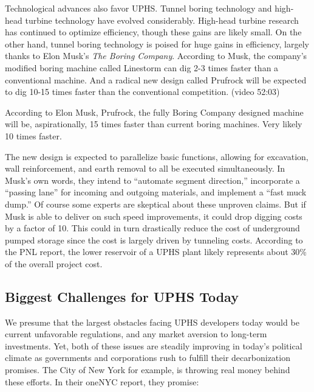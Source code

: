 \documentclass[hidelinks,12pt,a4paper]{article}
\begin{document}
Technological advances also favor UPHS. Tunnel boring technology and high-head turbine technology have evolved considerably. High-head turbine research has continued to optimize efficiency, though these gains are likely small. On the other hand, tunnel boring technology is poised for huge gains in efficiency, largely thanks to Elon Musk's \textit{The Boring Company}. According to Musk, the company's modified boring machine called Linestorm can dig 2-3 times faster than a conventional machine. And a radical new design called Prufrock will be expected to dig 10-15 times faster than the conventional competition.  \cite{TheBoringCompanyInformationSession} (video 52:03)

\begin{displayquote}
According to Elon Musk, Prufrock, the fully Boring Company designed machine will be, aspirationally, 15 times faster than current boring machines. Very likely 10 times faster.
\end{displayquote}

The new design is expected to parallelize basic functions, allowing for excavation, wall reinforcement, and earth removal to all be executed simultaneously. In Musk's own words, they intend to “automate segment direction,” incorporate a “passing lane” for incoming and outgoing materials, and implement a  “fast muck dump.” Of course some experts are skeptical about these unproven claims. \cite{ElonMuskTunnelingTechUnderLA} But if Musk is able to deliver on such speed improvements, it could drop digging costs by a factor of 10. This could in turn drastically reduce the cost of underground pumped storage since the cost is largely driven by tunneling costs. According to the PNL report, the lower reservoir of a UPHS plant likely represents about 30\% of the overall project cost.\cite{UndergroundPumpedHydroelectricStorage}

\subsection{Biggest Challenges for UPHS Today}
We presume that the largest obstacles facing UPHS developers today would be current unfavorable regulations, and any market aversion to long-term investments. Yet, both of these issues are steadily improving in today's political climate as governments and corporations rush to fulfill their decarbonization promises. The City of New York for example, is throwing real money behind these efforts. In their oneNYC report, they promise:
\end{document}
